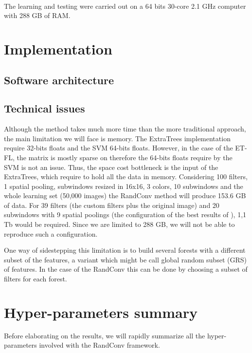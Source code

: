 \documentclass[a4paper]{report}
\begin{document}
	\paragraph{}
	The learning and testing were carried out on a 64 bits 30-core 2.1 GHz computer with 288 GB of RAM. %
	
	
	\section{Implementation}
		\subsection{Software architecture}
		\subsection{Technical issues}
		Although the method takes much more time than the more traditional approach, the main limitation we will face is memory. The ExtraTrees implementation require 32-bits floats and the SVM 64-bits floats. However, in the case of the ET-FL, the matrix is mostly sparse on therefore the 64-bits floats require by the SVM is not an issue. Thus, the space cost bottleneck is the input of the ExtraTrees, which require to hold all the data in memory. Considering 100 filters, 1 spatial pooling, subwindows resized in 16x16, 3 colors, 10 subwindows and the whole learning set (50,000 images) the RandConv method will produce 153.6 GB of data. For 39 filters (the custom filters plus the original image) and 20 subwindows with 9 spatial poolings (the configuration of the best results of \cite{}), 1,1 Tb would be required. Since we are limited to 288 GB, we will not be able to reproduce such a configuration.
		\par
		One way of sidestepping this limitation is to build several forests with a different subset of the features, a variant which might be call global random subset (GRS) of features. 
		In the case of the RandConv this can be done by choosing a subset of filters for each forest.
		
	\section{Hyper-parameters summary}
	Before elaborating on the results, we will rapidly summarize all the hyper-parameters involved with the RandConv framework.
	
\end{document}
